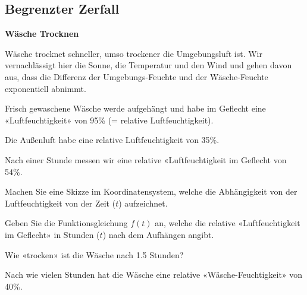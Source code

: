 \subsection{Begrenzter Zerfall}


\bbwActAufgabenNr{} \textbf{Wäsche Trocknen}

Wäsche trocknet schneller, umso trockener die Umgebungsluft ist. Wir
vernachlässigt hier die Sonne, die Temperatur und den Wind und gehen
davon aus, dass die Differenz der Umgebungs-Feuchte und der
Wäsche-Feuchte exponentiell abnimmt.

Frisch gewaschene Wäsche werde aufgehängt und habe im Geflecht eine «Luftfeuchtigkeit» von 95\%
(= relative Luftfeuchtigkeit).

Die Außenluft habe eine relative Luftfeuchtigkeit von 35\%. 


Nach einer
Stunde messen wir eine relative «Luftfeuchtigkeit im Geflecht von
54\%.


\begin{bbwAufgabenBlock}
\item Machen Sie eine Skizze im Koordinatensystem, welche die
Abhängigkeit von der Luftfeuchtigkeit von der Zeit ($t$) aufzeichnet.


\item Geben Sie die Funktionsgleichung $f(t)$ an, welche die relative
«Luftfeuchtigkeit im Geflecht» in Stunden ($t$) nach dem Aufhängen
angibt.


\item Wie «trocken» ist die Wäsche nach 1.5 Stunden?


\item Nach wie vielen Stunden hat die Wäsche eine relative
«Wäsche-Feuchtigkeit» von 40\%.


\TRAINER{

$$f(t) = 35 + 60 \cdot \left( \frac{19}{60}\right)^t$$
$f(t) = 40[\%]$ einsetzen:

$$40 [\%| = 35 + 60 \cdot \left( \frac{19}{60}\right)^t$$
$$5 [\%| = 60 \cdot \left( \frac{19}{60}\right)^t$$
$$\frac5{60} [\%| =\left( \frac{19}{60}\right)^t$$
$$t = \log_{\frac{19}{60}}(\frac5{60}) \approx 2.16 [\textrm{h}]$$
}%

\end{bbwAufgabenBlock}


